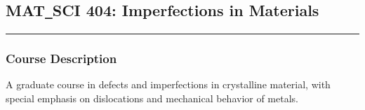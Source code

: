 	\subsection{MAT\texttt{\_}SCI 404: Imperfections in Materials}
	\vspace{-0.5em} \hfill \rule{0.4\textwidth}{.4pt}\newline
	\null \hfill {} \newline
	\null \hfill {}
\normalfont
	\subsubsection*{Course Description}
	A graduate course in defects and imperfections in crystalline material, with special emphasis on dislocations and mechanical behavior of metals. 
